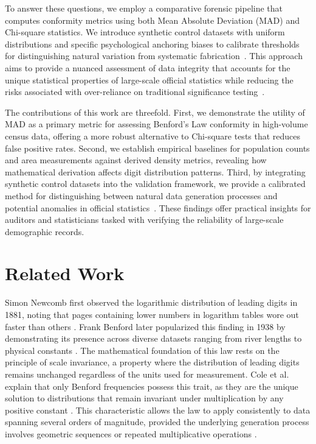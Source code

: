 \documentclass[11pt,a4paper]{article}
\begin{document}
To answer these questions, we employ a comparative forensic pipeline that computes conformity metrics using both Mean Absolute Deviation (MAD) and Chi-square statistics. We introduce synthetic control datasets with uniform distributions and specific psychological anchoring biases to calibrate thresholds for distinguishing natural variation from systematic fabrication~\cite{Josic2020TheAO}. This approach aims to provide a nuanced assessment of data integrity that accounts for the unique statistical properties of large-scale official statistics while reducing the risks associated with over-reliance on traditional significance testing~\cite{Kossovsky2021OnTM}.

The contributions of this work are threefold. First, we demonstrate the utility of MAD as a primary metric for assessing Benford's Law conformity in high-volume census data, offering a more robust alternative to Chi-square tests that reduces false positive rates. Second, we establish empirical baselines for population counts and area measurements against derived density metrics, revealing how mathematical derivation affects digit distribution patterns. Third, by integrating synthetic control datasets into the validation framework, we provide a calibrated method for distinguishing between natural data generation processes and potential anomalies in official statistics~\cite{Petras2025DetectingBL}. These findings offer practical insights for auditors and statisticians tasked with verifying the reliability of large-scale demographic records.

\section{Related Work}
Simon Newcomb first observed the logarithmic distribution of leading digits in 1881, noting that pages containing lower numbers in logarithm tables wore out faster than others \cite{Mir2025OnL}. Frank Benford later popularized this finding in 1938 by demonstrating its presence across diverse datasets ranging from river lengths to physical constants \cite{Hill1998TheFD}. The mathematical foundation of this law rests on the principle of scale invariance, a property where the distribution of leading digits remains unchanged regardless of the units used for measurement. Cole et al. explain that only Benford frequencies possess this trait, as they are the unique solution to distributions that remain invariant under multiplication by any positive constant \cite{Cole2019TestingTE}. This characteristic allows the law to apply consistently to data spanning several orders of magnitude, provided the underlying generation process involves geometric sequences or repeated multiplicative operations \cite{Kossler2024SomeNI}.
\end{document}
